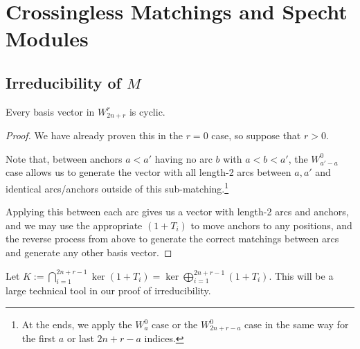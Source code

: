 \documentclass{amsart}
\begin{document}
\section{Crossingless Matchings and Specht Modules}
\subsection{Irreducibility of $M$}
\begin{lemma}
  \label{Cyclic}
  Every basis vector in $W_{2n + r}^r$ is cyclic.
\end{lemma}
\begin{proof}
  We have already proven this in the $r = 0$ case, so suppose that $r > 0$.

    Note that, between anchors $a<a'$ having no arc $b$ with $a < b < a'$, the $W_{a'-a}^0$ case allows us to generate the vector with all length-2 arcs between $a,a'$ and identical arcs/anchors outside of this sub-matching.\footnote{At the ends, we apply the $W_a^0$ case or the $W_{2n + r - a}^{0}$ case in the same way for the first $a$ or last $2n + r - a$ indices.}

  Applying this between each arc gives us a vector with length-2 arcs and anchors, and we may use the appropriate $(1+T_i)$ to move anchors to any positions, and the reverse process from above to generate the correct matchings between arcs and generate any other basis vector.
\end{proof}

Let $K := \bigcap_{i=1}^{2n+r-1} \ker (1 + T_i) = \ker \bigoplus_{i = 1}^{2n + r - 1} (1 + T_i)$.
This will be a large technical tool in our proof of irreducibility.
\end{document}
